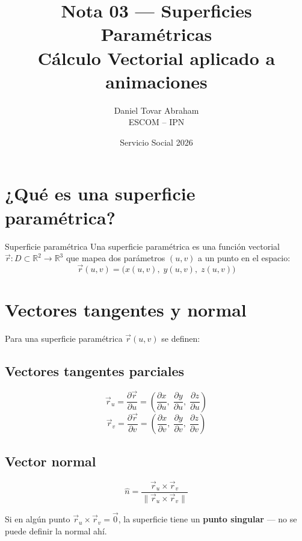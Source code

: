 \documentclass[12pt]{article}
\title{\textcolor{azulIPn}{\textbf{Nota 03 — Superficies Paramétricas}} \\
       \large Cálculo Vectorial aplicado a animaciones}
\author{Daniel Tovar Abraham \\ ESCOM -- IPN}
\date{Servicio Social 2026}
\begin{document}
\maketitle

\section{¿Qué es una superficie paramétrica?}

\begin{definicion}{Superficie paramétrica}
  Una superficie paramétrica es una función vectorial 
  $\vec{r}: D \subset \mathbb{R}^2 \to \mathbb{R}^3$ que mapea 
  dos parámetros $(u, v)$ a un punto en el espacio:
  \[
    \vec{r}(u,v) = \bigl(x(u,v),\; y(u,v),\; z(u,v)\bigr)
  \]
\end{definicion}

\section{Vectores tangentes y normal}

Para una superficie paramétrica $\vec{r}(u,v)$ se definen:

\subsection{Vectores tangentes parciales}
\[
  \vec{r}_u = \frac{\partial \vec{r}}{\partial u} = 
  \left(\frac{\partial x}{\partial u},\;
        \frac{\partial y}{\partial u},\;
        \frac{\partial z}{\partial u}\right)
\]
\[
  \vec{r}_v = \frac{\partial \vec{r}}{\partial v} = 
  \left(\frac{\partial x}{\partial v},\;
        \frac{\partial y}{\partial v},\;
        \frac{\partial z}{\partial v}\right)
\]

\subsection{Vector normal}
\[
  \hat{n} = \frac{\vec{r}_u \times \vec{r}_v}{\|\vec{r}_u \times \vec{r}_v\|}
\]

\begin{nota}
  Si en algún punto $\vec{r}_u \times \vec{r}_v = \vec{0}$, 
  la superficie tiene un \textbf{punto singular} — no se puede 
  definir la normal ahí.
\end{nota}
\end{document}
